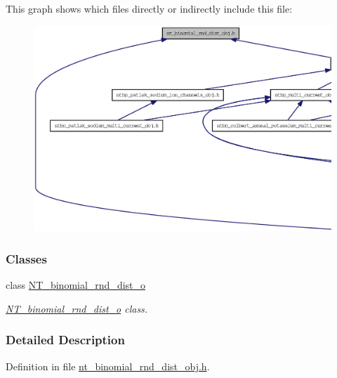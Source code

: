 This graph shows which files directly or indirectly include this file:
\nopagebreak
\begin{figure}[H]
\begin{center}
\leavevmode
\includegraphics[width=400pt]{nt__binomial__rnd__dist__obj_8h__dep__incl}
\end{center}
\end{figure}
\subsubsection*{Classes}
\begin{DoxyCompactItemize}
\item 
class \hyperlink{class_n_t__binomial__rnd__dist__o}{NT\_\-binomial\_\-rnd\_\-dist\_\-o}
\begin{DoxyCompactList}\small\item\em \hyperlink{class_n_t__binomial__rnd__dist__o}{NT\_\-binomial\_\-rnd\_\-dist\_\-o} class. \item\end{DoxyCompactList}\end{DoxyCompactItemize}


\subsubsection{Detailed Description}


Definition in file \hyperlink{nt__binomial__rnd__dist__obj_8h_source}{nt\_\-binomial\_\-rnd\_\-dist\_\-obj.h}.

